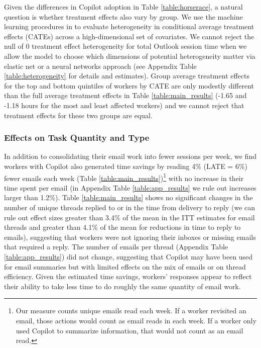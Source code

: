 \documentclass{article}
\begin{document}
Given the differences in Copilot adoption in Table \ref{table:horserace}, a natural question is whether treatment effects also vary by group.  We use the machine learning procedures in \citet{chernozhukov2025heteffects} to evaluate heterogeneity in conditional average treatment effects (CATEs) across a high-dimensional set of covariates.  We cannot reject the null of 0 treatment effect heterogeneity for total Outlook session time when we allow the model to choose which dimensions of potential heterogeneity matter via elastic net or a neural networks approach (see Appendix Table \ref{table:heterogeneity} for details and estimates).  Group average treatment effects for the top and bottom quintiles of workers by CATE are only modestly different than the full average treatment effects in Table \ref{table:main_results} (-1.65 and -1.18 hours for the most and least affected workers) and we cannot reject that treatment effects for these two groups are equal.



\subsubsection{Effects on Task Quantity and Type}

In addition to consolidating their email work into fewer sessions per week, we find workers with Copilot also generated time savings by reading 4\% (LATE = 6\%) fewer emails each week (Table \ref{table:main_results})\footnote{Our measure counts unique emails read each week. If a worker revisited an email, those actions would count as email reads in each week. If a worker only used Copilot to summarize information, that would not count as an email read.} with no increase in their time spent per email (in Appendix Table \ref{table:app_results} we rule out increases larger than 1.2\%). Table \ref{table:main_results} shows no significant changes in the number of unique threads replied to or in the time from delivery to reply (we can rule out effect sizes greater than 3.4\% of the mean in the ITT estimates for email threads and greater than 4.1\% of the mean for reductions in time to reply to emails), suggesting that workers were not ignoring their inboxes or missing emails that required a reply. The number of emails per thread (Appendix Table \ref{table:app_results}) did not change, suggesting that Copilot may have been used for email summaries but with limited effects on the mix of emails or on thread efficiency. Given the estimated time savings, workers' responses appear to reflect their ability to take less time to do roughly the same quantity of email work.  
\end{document}
